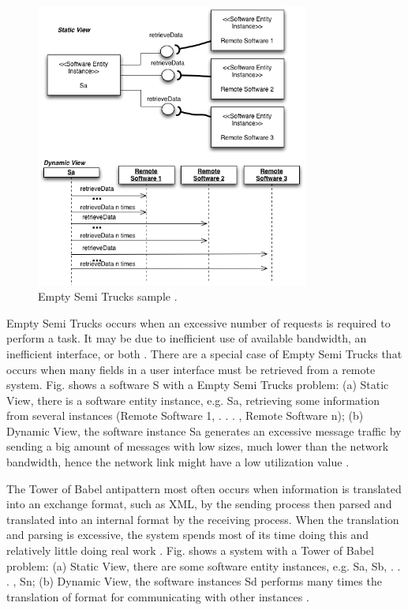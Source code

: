 \begin{figure}[h]
\centering
\includegraphics[width=0.8\textwidth]{./images/trucks.png}
\caption{Empty Semi Trucks sample \cite{Vetoio2011}.}
\label{fig:trucks}
\end{figure}

Empty Semi Trucks occurs when an excessive number of requests is required to perform a task. It may be due to inefficient use of available bandwidth, an inefficient interface, or both \cite{Arcelli2012}. There are a special case of Empty Semi Trucks that occurs  when many fields in a user interface must be retrieved from a
remote system. Fig. shows a software S with a Empty Semi Trucks problem: (a) Static View, there is a software entity instance, e.g. Sa, retrieving some information from several instances (Remote Software 1, . . . , Remote Software n); (b) Dynamic View, the software instance Sa generates an excessive message traffic by sending a big amount of messages with low sizes, much lower than the network bandwidth, hence the network link might have a low utilization value \cite{Vetoio2011}.

The Tower of Babel antipattern most often occurs when information is translated into an exchange format, such as XML, by the sending process then parsed and translated into an
internal format by the receiving process. When the translation and parsing is excessive, the system spends most
of its time doing this and relatively little doing real work \cite{Smith2003}. Fig. shows a system with a Tower of Babel problem: (a) Static View, there are some software entity instances, e.g. Sa, Sb, . . . , Sn; (b) Dynamic View, the software instances Sd performs many times the translation of format for communicating with other instances \cite{Vetoio2011}.

